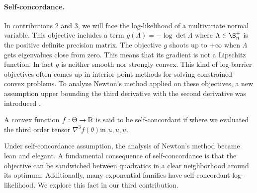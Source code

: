 \paragraph{Self-concordance.}
In contributions 2 and 3, we will face the log-likelihood of a multivariate normal variable. 
This objective includes a term $g(\Lambda) = -\log \det \Lambda$ where $\Lambda\in \S_n^+$ is the positive definite precision matrix. 
The objective $g$ shoots up to $+\infty$ when $\Lambda$ gets eigenvalues close from zero. 
This means that its gradient is not a Lipschitz function.
In fact  $g$ is neither smooth nor strongly convex.
This kind of log-barrier objectives often comes up in interior point methods for solving constrained convex problems.
To analyze Newton's method applied on these objectives, a new assumption upper bounding the third derivative with the second derivative was introduced \citep{nemirovski1983problem}. 
\begin{definition}
	\citep[definition 4.1.1]{nesterov2004Intro}
	A convex function $f:\Theta \rightarrow\mathbb{R}$ is said to be self-concordant if
	where we evaluated the third order tensor $\nabla^3 f(\theta)$in $u,u,u$.
\end{definition}
Under self-concordance assumption, the analysis of Newton's method became lean and elegant. A fundamental consequence of self-concordance is that the objective can be sandwiched between quadratics in a clear neighborhood around its optimum. Additionally, many exponential families have self-concordant log-likelihood. We explore this fact in our third contribution.

